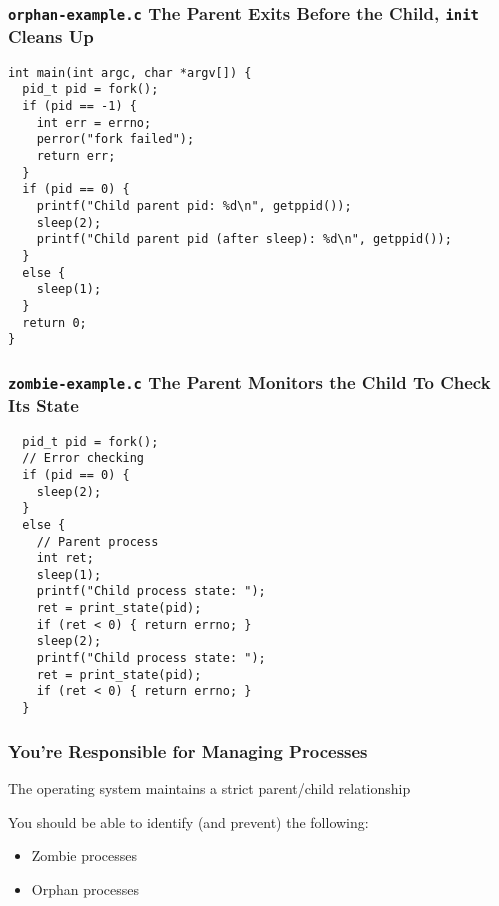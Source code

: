   \begin{frame}[fragile]
    \frametitle{\texttt{orphan-example.c} The Parent Exits Before the Child, \texttt{init} Cleans Up}

    \begin{lstlisting}
int main(int argc, char *argv[]) {
  pid_t pid = fork();
  if (pid == -1) {
    int err = errno;
    perror("fork failed");
    return err;
  }
  if (pid == 0) {
    printf("Child parent pid: %d\n", getppid());
    sleep(2);
    printf("Child parent pid (after sleep): %d\n", getppid());
  }
  else {
    sleep(1);
  }
  return 0;
}

    \end{lstlisting}
  \end{frame}

  \begin{frame}[fragile]
    \frametitle{\texttt{zombie-example.c} The Parent Monitors the Child To Check Its State}

    \begin{lstlisting}
  pid_t pid = fork();
  // Error checking
  if (pid == 0) {
    sleep(2);
  }
  else {
    // Parent process
    int ret;
    sleep(1);
    printf("Child process state: ");
    ret = print_state(pid);
    if (ret < 0) { return errno; }
    sleep(2);
    printf("Child process state: ");
    ret = print_state(pid);
    if (ret < 0) { return errno; }
  }
    \end{lstlisting}
  \end{frame}

  \begin{frame}
    \frametitle{You're Responsible for Managing Processes}

    The operating system maintains a strict parent/child relationship
    
    \vspace{2em}
    
    You should be able to identify (and prevent) the following:
    \begin{itemize}
      \item Zombie processes
      \item Orphan processes
    \end{itemize}
  \end{frame}

